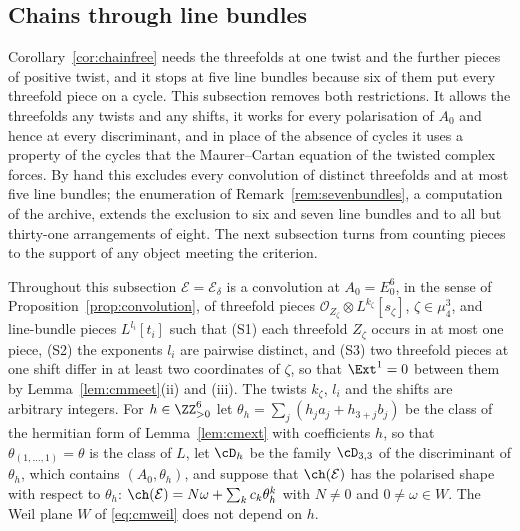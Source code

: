 \subsection{Chains through line bundles}\label{ssec:linebundles}

Corollary~\ref{cor:chainfree} needs the threefolds at one twist and the further pieces of positive twist, and it stops at five line bundles because six of them put every threefold piece on a cycle. This subsection removes both restrictions. It allows the threefolds any twists and any shifts, it works for every polarisation of $A_{0}$ and hence at every discriminant, and in place of the absence of cycles it uses a property of the cycles that the Maurer--Cartan equation of the twisted complex forces. By hand this excludes every convolution of distinct threefolds and at most five line bundles; the enumeration of Remark~\ref{rem:sevenbundles}, a computation of the archive, extends the exclusion to six and seven line bundles and to all but thirty-one arrangements of eight. The next subsection turns from counting pieces to the support of any object meeting the criterion.

\begin{setup}\label{setup:lb}
Throughout this subsection $\mathcal{E}=\mathcal{E}_{\delta}$ is a convolution at $A_{0}=E_{0}^{6}$, in the sense of Proposition~\ref{prop:convolution}, of threefold pieces $\mathcal{O}_{Z_{\zeta}}\otimes L^{k_{\zeta}}[s_{\zeta}]$, $\zeta\in\mu_{4}^{3}$, and line-bundle pieces $L^{l_{i}}[t_{i}]$ such that (S1) each threefold $Z_{\zeta}$ occurs in at most one piece, (S2) the exponents $l_{i}$ are pairwise distinct, and (S3) two threefold pieces at one shift differ in at least two coordinates of $\zeta$, so that $\Ext^{1}=0$ between them by Lemma~\ref{lem:cmmeet}(ii) and (iii). The twists $k_{\zeta}$, $l_{i}$ and the shifts are arbitrary integers. For $h\in\ZZ_{>0}^{6}$ let $\theta_{h}=\sum_{j}(h_{j}a_{j}+h_{3+j}b_{j})$ be the class of the hermitian form of Lemma~\ref{lem:cmext} with coefficients $h$, so that $\theta_{(1,\dots,1)}=\theta$ is the class of $L$, let $\cD_{h}$ be the family $\cD_{3,3}$ of the discriminant of $\theta_{h}$, which contains $(A_{0},\theta_{h})$, and suppose that $\ch(\mathcal{E})$ has the polarised shape with respect to $\theta_{h}$: $\ch(\mathcal{E})=N\omega+\sum_{k}c_{k}\theta_{h}^{k}$ with $N\ne0$ and $0\ne\omega\in W$. The Weil plane $W$ of \eqref{eq:cmweil} does not depend on $h$.
\end{setup}

